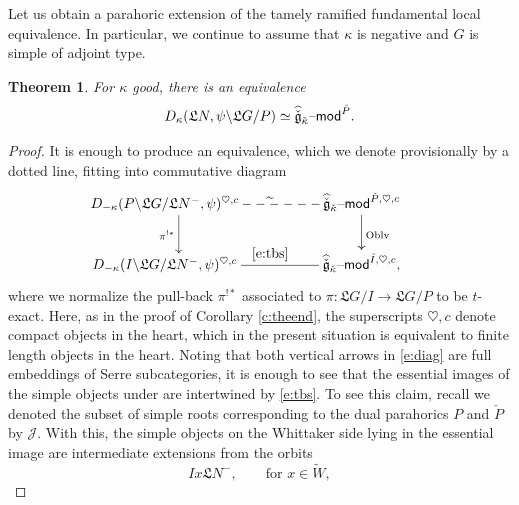 \documentclass[11pt,reqno]{amsart}
\newcommand{\cgk}{\widehat{\check{\mathfrak{g}}}_{\check{\kappa}}}
\newcommand{\fL}{\mathfrak{L}}
\newcommand{\on}{\operatorname}
\newtheorem{theo}[subsubsection]{Theorem}
\theoremstyle{remark}
\numberwithin{equation}{section}
\newcommand{\sJ}{\mathscr{J}}
\renewcommand{\mod}{\text{\textendash}\mathsf{mod}}
\begin{document}
\subsubsection{}
Let us obtain 
a parahoric extension of the tamely ramified fundamental local equivalence. In 
particular, we continue to assume that $\kappa$ is negative and $G$ is simple 
of adjoint type. 

\begin{theo}\label{t:galu} For $\kappa$ good, there is an 
	equivalence
	\begin{equation}  D_{\kappa}( \fL N, \psi \backslash 
	\fL G / P) \simeq 
	\cgk\mod^{\check{P}}.
	\end{equation}
\end{theo}

\begin{proof}It is enough to produce an equivalence, which we 
	denote provisionally by a dotted line, fitting into commutative diagram
%
	\begin{equation} \label{e:diag} \begin{gathered}
	\xymatrix{ \hspace{-7mm} D_{-\kappa}(P \backslash \fL G / 
		\fL N^-, 
		\psi)^{\heartsuit, c}  
		\ar@{--}[rr]^\sim \ar[d]_{\pi^{!*}} 
		& &
		\cgk\mod^{\check{P}, \heartsuit, c} \ar[d]^{\on{Oblv}} 
		\\\hspace{-7mm} 
		D_{-\kappa}(I \backslash \fL G / \fL N^-, \psi )^{\heartsuit, 
			c} 
		\ar@{-}[rr]^{\eqref{e:tbs}} && \cgk\mod^{\check{I}, 
			\heartsuit, c}, }\end{gathered}
	\end{equation}
	where we normalize the pull-back $\pi^{!*}$ associated to $\pi: \fL G / I
	\rightarrow \fL 
	G/ P$ to be $t$-exact. Here, as in the proof of Corollary \ref{c:theend}, 
	the superscripts $\heartsuit, c$ denote compact objects in the heart, which 
	in the present situation is equivalent to finite length objects in the 
	heart. Noting 
	that both vertical arrows in \eqref{e:diag} 
	are full 
	embeddings 
	of Serre subcategories,  it is enough 
	to 
	see that the essential images of the simple objects under are intertwined 
	by \eqref{e:tbs}. To see this claim, 
	recall 
	we denoted the subset of simple roots corresponding to the dual parahorics  
	$P$ and $\check{P}$ by $\sJ$. With this, the simple objects on the 
	Whittaker 
	side lying in the essential image are 
	intermediate extensions from the orbits
	\[ Ix\fL N^-, \quad \quad \text{for } x \in \widetilde{W},
	\]

\end{proof}
\end{document}
